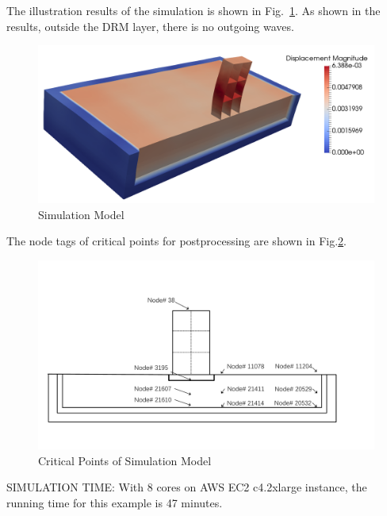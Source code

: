 The illustration results of the simulation is shown in Fig.~\ref{fig_decon_3D_motion_3D_model_results_structure}.
As shown in the results, outside the DRM layer, there is no outgoing waves. 

\begin{figure}[H]
  \centering
  \includegraphics[width = 12cm]{./Figure-files/nonlinear_analysis_steps/soil-structure/DRM3D_motion3D_structure.png}
  \caption{Simulation Model}
  \label{fig_decon_3D_motion_3D_model_results_structure}
\end{figure}

The node tags of critical points for postprocessing are shown in Fig.\ref{fig_points_3D_motion_3D_model_results_structure}.

\begin{figure}[H]
  \centering
  \includegraphics[width = 12cm]{./Figure-files/nonlinear_analysis_steps/soil-structure/soil-structure_node_location.pdf}
  \caption{Critical Points of Simulation Model}
  \label{fig_points_3D_motion_3D_model_results_structure}
\end{figure}

SIMULATION TIME: With 8 cores on AWS EC2 c4.2xlarge instance, the running time for this example is 47 minutes.

\clearpage
\newpage

